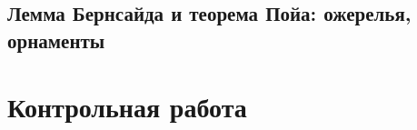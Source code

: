 \documentclass[10pt, twoside]{article}
\begin{document}
\subsection{Лемма Бернсайда и теорема Пойа: ожерелья, орнаменты}
% 
% 
% 

\newpage
{}
\section*{Контрольная работа}
% 
\end{document}
